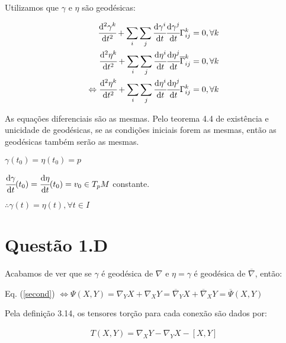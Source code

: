 \documentclass[10pt,a4paper]{article}
\begin{document}
		Utilizamos que $\gamma$ e $\eta$ s\~ao geod\'esicas:

		\begin{align*}
		  \cfrac{\mathrm{d}^2 \gamma^k}{\mathrm{d} t^2} + \sum_i \sum_j \cfrac{\mathrm{d} \gamma^i}{\mathrm{d} t} \cfrac{\mathrm{d} \gamma^j}{\mathrm{d} t} \Gamma_{ij}^k &= 0, \forall k \\
		  \cfrac{\mathrm{d}^2 \eta^k}{\mathrm{d} t^2} + \sum_i \sum_j \cfrac{\mathrm{d} \eta^i}{\mathrm{d} t} \cfrac{\mathrm{d} \eta^j}{\mathrm{d} t} \overline{\Gamma}_{ij}^k &= 0, \forall k \\
		  \Leftrightarrow \cfrac{\mathrm{d}^2 \eta^k}{\mathrm{d} t^2} + \sum_i \sum_j \cfrac{\mathrm{d} \eta^i}{\mathrm{d} t} \cfrac{\mathrm{d} \eta^j}{\mathrm{d} t} \Gamma_{ij}^k &= 0, \forall k
		\end{align*}

		As equa\c{c}\~oes diferenciais s\~ao as mesmas. Pelo teorema 4.4 de exist\^encia e unicidade de geod\'esicas, se as condi\c{c}\~oes iniciais forem as mesmas, ent\~ao as geod\'esicas tamb\'em ser\~ao as mesmas.

		$\gamma(t_0) = \eta(t_0) = p$

		$\cfrac{\mathrm{d} \gamma}{\mathrm{d} t}(t_0) = \cfrac{\mathrm{d} \eta}{\mathrm{d} t}(t_0) = v_0 \in T_pM$ constante.

		$\therefore \gamma(t) = \eta(t), \forall t \in I$

		\vspace{600mm}

	\section{Quest\~ao 1.D}
		\begin{flushright}
		\end{flushright}

		Acabamos de ver que se $\gamma$ \'e geod\'esica de $\nabla$ e $\eta = \gamma$ \'e geod\'esica de $\overline{\nabla}$, ent\~ao:

		Eq. (\ref{second}) $\Leftrightarrow \Psi(X,Y) = \nabla_Y X + \nabla_X Y = \overline{\nabla}_Y X + \overline{\nabla}_X Y = \overline{\Psi}(X, Y)$

		Pela defini\c{c}\~ao 3.14, os tensores tor\c{c}\~ao para cada conex\~ao s\~ao dados por:

		\begin{align}
		T(X, Y) = \nabla_X Y - \nabla_Y X - [X, Y] \label{tortion}
		\end{align}
\end{document}
